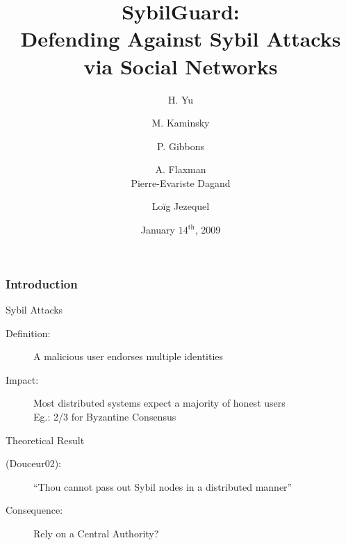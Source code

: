 \documentclass{beamer}
\title[SybilGuard]{SybilGuard:\\ Defending Against Sybil Attacks via Social Networks}
\author[Dagand, Jezequel]{H. {\sc Yu} \and M. {\sc Kaminsky} \and P. {\sc Gibbons} \and A. {\sc Flaxman}\\
                          Pierre-Evariste {\sc Dagand} \and Loïg {\sc Jezequel}}
\date{January $14^{\mbox{th}}$, 2009}
\institute[PAP]{Pair-à-Pair}
\begin{document}

\begin{frame}
\maketitle
\end{frame}


\begin{frame}

  \frametitle{Introduction}

  \begin{block}{Sybil Attacks}
    \begin{description}
      \item[Definition:] A malicious user endorses multiple identities  %
      \item[Impact:] Most distributed systems expect a majority of honest users\\
	             Eg.: 2/3 for Byzantine Consensus
    \end{description}
  \end{block}

  \begin{block}{Theoretical Result}
    \begin{description}
      \item[(Douceur02):] ``Thou cannot pass out Sybil nodes in a distributed manner'' %
      \item[Consequence:] Rely on a Central Authority? 
    \end{description}
  \end{block}

\end{frame}

\end{document}
